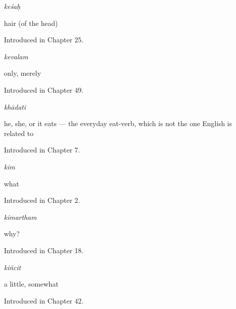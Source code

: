 \noindent\begin{minipage}[t]{\linewidth}
\raggedright
\textbf{}\enspace\emph{keśaḥ}\par
\small hair (of the head)\par
\footnotesize Introduced in Chapter 25.
\end{minipage}\par\medskip

\noindent\begin{minipage}[t]{\linewidth}
\raggedright
\textbf{}\enspace\emph{kevalam}\par
\small only, merely\par
\footnotesize Introduced in Chapter 49.
\end{minipage}\par\medskip

\noindent\begin{minipage}[t]{\linewidth}
\raggedright
\textbf{}\enspace\emph{khādati}\par
\small he, she, or it eats — the everyday eat-verb, which is not the one English is related to\par
\footnotesize Introduced in Chapter 7.
\end{minipage}\par\medskip

\noindent\begin{minipage}[t]{\linewidth}
\raggedright
\textbf{}\enspace\emph{kim}\par
\small what\par
\footnotesize Introduced in Chapter 2.
\end{minipage}\par\medskip

\noindent\begin{minipage}[t]{\linewidth}
\raggedright
\textbf{}\enspace\emph{kimartham}\par
\small why?\par
\footnotesize Introduced in Chapter 18.
\end{minipage}\par\medskip

\noindent\begin{minipage}[t]{\linewidth}
\raggedright
\textbf{}\enspace\emph{kiñcit}\par
\small a little, somewhat\par
\footnotesize Introduced in Chapter 42.
\end{minipage}\par\medskip

